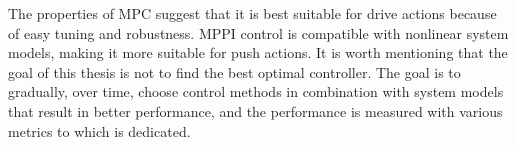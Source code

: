 The properties of \ac{MPC} suggest that it is best suitable for drive actions because of easy tuning and robustness. \Ac{MPPI} control is compatible with nonlinear system models, making it more suitable for push actions. It is worth mentioning that the goal of this thesis is not to find the best optimal controller. The goal is to gradually, over time, choose control methods in combination with system models that result in better performance, and the performance is measured with various metrics to which  is dedicated.\bs


%
